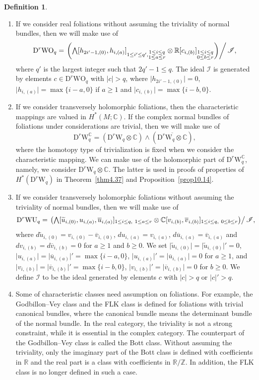 \documentclass[12pt]{amsart}
\newcommand{\C}{{\mathbb C}}
\newcommand{\R}{{\mathbb R}}
\newcommand{\Z}{{\mathbb Z}}
\newcommand{\WU}{\mathrm{WU}}
\newcommand{\WO}{\mathrm{WO}}
\newcommand{\W}{\mathrm{W}}
\newcommand{\D}{\mathrm{D}}
\newcommand{\Wedge}{{\textstyle\bigwedge}}
\newcommand{\norm}[1]{\lvert#1\rvert}
\theoremstyle{definition}
\newtheorem{definition}[theorem]{Definition}
\theoremstyle{remark}
\begin{document}
\begin{definition}
\label{def7.20}
\begin{enumerate}
\item
If we consider real foliations without assuming the triviality of normal bundles, then we will make use of
\[
\D^r\WO_q=\left.\left(\Wedge[h_{2i'-1,(0)},h_{i,(a)}]_{1\leq i'\leq q',\substack{1\leq i\leq q\\ 1\leq a\leq r}}\otimes\R[c_{i,(b)}]_{\substack{1\leq i\leq q\\ 0\leq b\leq r}}\right)\right/\mathscr{I},
\]
where $q'$ is the largest integer such that $2q'-1\leq q$.
The ideal $\mathscr{I}$ is generated by elements $c\in\D^r\WO_q$ with $\norm{c}>q$, where $\norm{h_{2i'-1,(0)}}=0$, $\norm{h_{i,(a)}}=\max\{i-a,0\}$ if $a\geq1$ and $\norm{c_{i,(b)}}=\max\{i-b,0\}$.
\item
If we consider transversely holomorphic foliations, then the characteristic mappings are valued in $H^*(M;\C)$.
If the complex normal bundles of foliations under considerations are trivial, then we will make use of
\[
\D^r\W^\C_q=(\D^r\W_q\otimes\C)\wedge(\overline{\D^r\W_q\otimes\C}),
\]
where the homotopy type of trivialization is fixed when we consider the characteristic mapping.
We can make use of the holomorphic part of $\D^r\W_q^\C$, namely, we consider $\D^r\W_q\otimes\C$.
The latter is used in proofs of properties of $H^*(\D^r\W_q)$ in Theorem~\ref{thm4.37} and Proposition~\ref{prop10.14}.
\item
If we consider transversely holomorphic foliations without assuming the triviality of normal bundles, then we will make use of
\[
\D^r\WU_q=\left.\left(\Wedge[\widetilde{u}_{i,(0)},u_{i,(a)},\overline{u}_{i,(a)}]_{1\leq i\leq q,\ 1\leq a\leq r}\otimes\C[v_{i,(b)},\overline{v}_{i,(b)}]_{1\leq i\leq q,\ 0\leq b\leq r}\right)\right/\mathscr{I},
\]
where $d\widetilde{u}_{i,(0)}=v_{i,(0)}-\overline{v}_{i,(0)}$, $du_{i,(a)}=v_{i,(a)}$, $d\overline{u}_{i,(a)}=\overline{v}_{i,(a)}$ and $dv_{i,(b)}=d\overline{v}_{i,(b)}=0$ for $a\geq1$ and $b\geq0$.
We set $\norm{\widetilde{u}_{i,(0)}}=\norm{\widetilde{u}_{i,(0)}}'=0$, $\norm{u_{i,(a)}}=\norm{\overline{u}_{i,(a)}}'=\max\{i-a,0\}$, $\norm{u_{i,(a)}}'=\norm{\overline{u}_{i,(a)}}=0$ for $a\geq1$, and $\norm{v_{i,(b)}}=\norm{\overline{v}_{i,(b)}}'=\max\{i-b,0\}$, $\norm{v_{i,(b)}}'=\norm{\overline{v}_{i,(b)}}=0$ for $b\geq0$.
We define $\mathscr{I}$ to be the ideal generated by elements $c$ with $\norm{c}>q$ or $\norm{c}'>q$.
\item
Some of characteristic classes need assumption on foliations.
For example, the Godbillon--Vey class and the FLK class is defined for foliations with trivial canonical bundles, where the canonical bundle means the determinant bundle of the normal bundle.
In the real category, the triviality is not a strong constraint, while it is essential in the complex category.
The counterpart of the Godbillon--Vey class is called the Bott class.
Without assuming the triviality, only the imaginary part of the Bott class is defined with coefficients in $\R$ and the real part is a class with coefficients in $\R/\Z$.
In addition, the FLK class is no longer defined in such a case.
\end{enumerate}
\end{definition}
\end{document}

